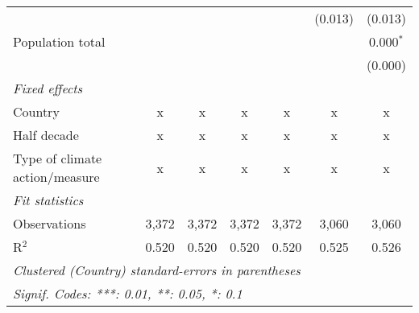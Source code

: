 \begin{tabular}{lcccccc}
                                               &         &         &         &              & (0.013)       & (0.013)\\   
   Population total                            &         &         &         &              &               & 0.000$^{*}$\\   
                                               &         &         &         &              &               & (0.000)\\   
   \emph{Fixed effects}\\
   Country                                     & x       & x       & x       & x            & x             & x\\  
   Half decade                                 & x       & x       & x       & x            & x             & x\\  
   Type of climate action/measure              & x       & x       & x       & x            & x             & x\\  
   \midrule \emph{Fit statistics}\\
   Observations                                & 3,372   & 3,372   & 3,372   & 3,372        & 3,060         & 3,060\\  
   R$^2$                                       & 0.520   & 0.520   & 0.520   & 0.520        & 0.525         & 0.526\\  
   \midrule
   \multicolumn{7}{l}{\emph{Clustered (Country) standard-errors in parentheses}}\\
   \multicolumn{7}{l}{\emph{Signif. Codes: ***: 0.01, **: 0.05, *: 0.1}}\\
\end{tabular}
\par\endgroup


